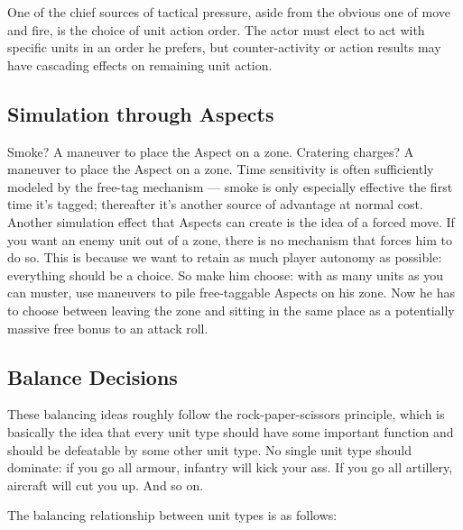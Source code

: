 One of the chief sources of tactical pressure, aside from the obvious one of move and fire, is the choice of unit action order. The actor must elect to act with specific units in an order he prefers, but counter-activity or action results may have cascading effects on remaining unit action.

\subsection{Simulation through Aspects}\label{sec:simulation-through-aspects}

Smoke? A maneuver to place the Aspect  on a zone. Cratering charges? A maneuver to place the Aspect  on a zone. Time sensitivity is often sufficiently modeled by the free-tag mechanism --- smoke is only especially effective the first time it's tagged; thereafter it's another source of advantage at normal cost. Another simulation effect that Aspects can create is the idea of a forced move. If you want an enemy unit out of a zone, there is no mechanism that forces him to do so. This is because we want to retain as much player autonomy as possible: everything should be a choice. So make him choose: with as many units as you can muster, use maneuvers to pile free-taggable Aspects on his zone. Now he has to choose between leaving the zone and sitting in the same place as a potentially massive free bonus to an attack roll.

\subsection{Balance Decisions}\label{sec:balance-decisions}

These balancing ideas roughly follow the rock-paper-scissors principle, which is basically the idea that every unit type should have some important function and should be defeatable by some other unit type. No single unit type should dominate: if you go all armour, infantry will kick your ass. If you go all artillery, aircraft will cut you up. And so on.

The balancing relationship between unit types is as follows:


